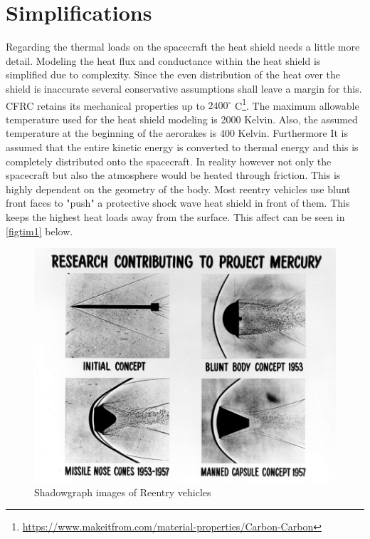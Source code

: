 \section{Simplifications}
\qquad Regarding the thermal loads on the spacecraft the heat shield needs a little more detail. Modeling the heat flux and conductance within the heat shield is simplified due to complexity. Since the even distribution of the heat over the shield is inaccurate several conservative assumptions shall leave a margin for this. CFRC retains its mechanical properties up to $2400^\circ$ C\footnote{\url{https://www.makeitfrom.com/material-properties/Carbon-Carbon}}. The maximum allowable temperature used for the heat shield modeling is 2000 Kelvin. Also, the assumed temperature at the beginning of the aerorakes is $400$ Kelvin. Furthermore It is assumed that the entire kinetic energy is converted to thermal energy and this is completely distributed onto the spacecraft. In reality however not only the spacecraft but also the atmosphere would be heated through friction. This is highly dependent on the geometry of the body. Most reentry vehicles use blunt front faces to "push" a protective shock wave heat shield in front of them. This keeps the highest heat loads away from the surface. This affect can be seen in \autoref{figtim1} below. \\
\begin{figure}[H]
	\centering\includegraphics[width=\linewidth]{shadowgraph}
	\caption{Shadowgraph images of Reentry vehicles}\label{figtim1}
\end{figure}

